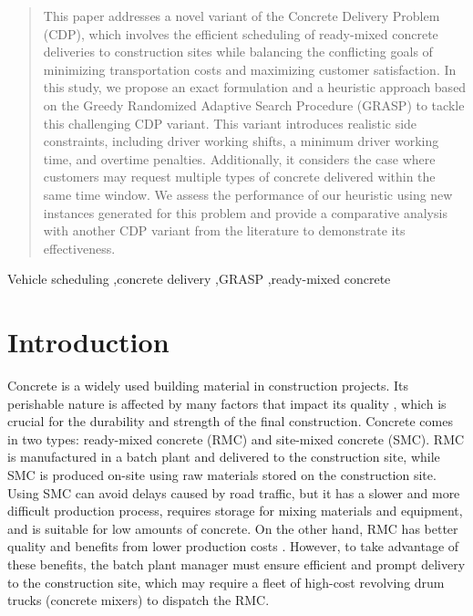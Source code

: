 \documentclass[authoryear,preprint,review,11pt]{elsarticle}
\begin{document}
\begin{frontmatter}
\begin{abstract}
This paper addresses a novel variant of the Concrete Delivery Problem (CDP), which involves the efficient scheduling of ready-mixed concrete deliveries to construction sites while balancing the conflicting goals of minimizing transportation costs and maximizing customer satisfaction. In this study, we propose an exact formulation and a heuristic approach based on the Greedy Randomized Adaptive Search Procedure (GRASP) to tackle this challenging CDP variant. This variant introduces realistic side constraints, including driver working shifts, a minimum driver working time, and overtime penalties. Additionally, it considers the case where customers may request multiple types of concrete delivered within the same time window. We assess the performance of our heuristic using new instances generated for this problem and provide a comparative analysis with another CDP variant from the literature to demonstrate its effectiveness.
\end{abstract}


\begin{keyword}
Vehicle scheduling \sep  concrete delivery \sep GRASP \sep ready-mixed concrete
\end{keyword}

\end{frontmatter}


\section{Introduction}
\label{sec:cdp_intro}
Concrete is a widely used building material in construction projects. Its perishable nature is affected by many factors that impact its quality \citep{sinha_quality_2021}, which is crucial for the durability and strength of the final construction. Concrete comes in two types: ready-mixed concrete (RMC) and site-mixed concrete (SMC). RMC is manufactured in a batch plant and delivered to the construction site, while SMC is produced on-site using raw materials stored on the construction site. Using SMC can avoid delays caused by road traffic, but it has a slower and more difficult production process, requires storage for mixing materials and equipment, and is suitable for low amounts of concrete. On the other hand, RMC has better quality and benefits from lower production costs \citep{muresan_comparing}. However, to take advantage of these benefits, the batch plant manager must ensure efficient and prompt delivery to the construction site, which may require a fleet of high-cost revolving drum trucks (concrete mixers) to dispatch the RMC.
\end{document}
